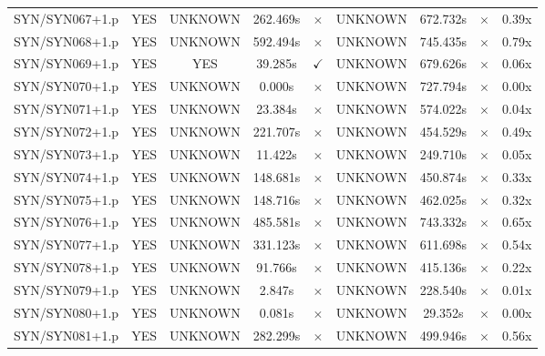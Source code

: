 \documentclass[a4paper,10pt]{article}
\begin{document}
\begin{longtable}{lcccccccc}
SYN/SYN067+1.p & YES & UNKNOWN & 262.469s & \cellcolor{mismatchcolor}$\times$ & UNKNOWN & 672.732s & \cellcolor{mismatchcolor}$\times$ & 0.39x \\
SYN/SYN068+1.p & YES & UNKNOWN & 592.494s & \cellcolor{mismatchcolor}$\times$ & UNKNOWN & 745.435s & \cellcolor{mismatchcolor}$\times$ & 0.79x \\
SYN/SYN069+1.p & YES & YES & 39.285s & \cellcolor{matchcolor}$\checkmark$ & UNKNOWN & 679.626s & \cellcolor{mismatchcolor}$\times$ & 0.06x \\
SYN/SYN070+1.p & YES & UNKNOWN & 0.000s & \cellcolor{mismatchcolor}$\times$ & UNKNOWN & 727.794s & \cellcolor{mismatchcolor}$\times$ & 0.00x \\
SYN/SYN071+1.p & YES & UNKNOWN & 23.384s & \cellcolor{mismatchcolor}$\times$ & UNKNOWN & 574.022s & \cellcolor{mismatchcolor}$\times$ & 0.04x \\
SYN/SYN072+1.p & YES & UNKNOWN & 221.707s & \cellcolor{mismatchcolor}$\times$ & UNKNOWN & 454.529s & \cellcolor{mismatchcolor}$\times$ & 0.49x \\
SYN/SYN073+1.p & YES & UNKNOWN & 11.422s & \cellcolor{mismatchcolor}$\times$ & UNKNOWN & 249.710s & \cellcolor{mismatchcolor}$\times$ & 0.05x \\
SYN/SYN074+1.p & YES & UNKNOWN & 148.681s & \cellcolor{mismatchcolor}$\times$ & UNKNOWN & 450.874s & \cellcolor{mismatchcolor}$\times$ & 0.33x \\
SYN/SYN075+1.p & YES & UNKNOWN & 148.716s & \cellcolor{mismatchcolor}$\times$ & UNKNOWN & 462.025s & \cellcolor{mismatchcolor}$\times$ & 0.32x \\
SYN/SYN076+1.p & YES & UNKNOWN & 485.581s & \cellcolor{mismatchcolor}$\times$ & UNKNOWN & 743.332s & \cellcolor{mismatchcolor}$\times$ & 0.65x \\
SYN/SYN077+1.p & YES & UNKNOWN & 331.123s & \cellcolor{mismatchcolor}$\times$ & UNKNOWN & 611.698s & \cellcolor{mismatchcolor}$\times$ & 0.54x \\
SYN/SYN078+1.p & YES & UNKNOWN & 91.766s & \cellcolor{mismatchcolor}$\times$ & UNKNOWN & 415.136s & \cellcolor{mismatchcolor}$\times$ & 0.22x \\
SYN/SYN079+1.p & YES & UNKNOWN & 2.847s & \cellcolor{mismatchcolor}$\times$ & UNKNOWN & 228.540s & \cellcolor{mismatchcolor}$\times$ & 0.01x \\
SYN/SYN080+1.p & YES & UNKNOWN & 0.081s & \cellcolor{mismatchcolor}$\times$ & UNKNOWN & 29.352s & \cellcolor{mismatchcolor}$\times$ & 0.00x \\
SYN/SYN081+1.p & YES & UNKNOWN & 282.299s & \cellcolor{mismatchcolor}$\times$ & UNKNOWN & 499.946s & \cellcolor{mismatchcolor}$\times$ & 0.56x \\

\end{longtable}
\end{document}
